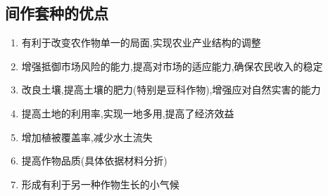 \documentclass[a4paper]{article}
\begin{document}
    \subsection{间作套种的优点}
    \begin{enumerate}
        \item 有利于改变农作物单一的局面,实现农业产业结构的调整
        \item 增强抵御市场风险的能力,提高对市场的适应能力,确保农民收入的稳定
        \item 改良土壤,提高土壤的肥力(特别是豆科作物),增强应对自然实害的能力
        \item 提高土地的利用率,实现一地多用,提高了经济效益
        \item 增加植被覆盖率,减少水土流失
        \item 提高作物品质(具体依据材料分折)
        \item 形成有利于另一种作物生长的小气候
    \end{enumerate}
\end{document}
